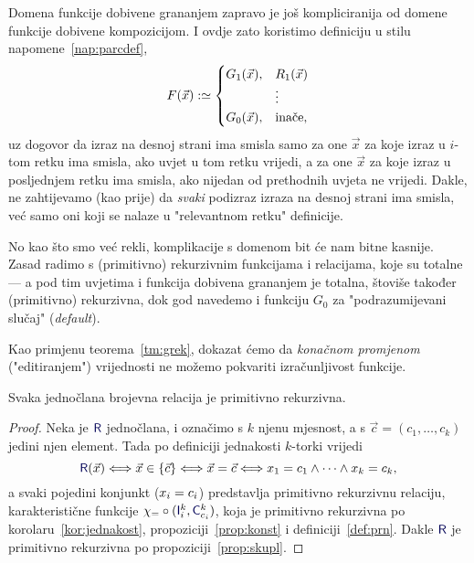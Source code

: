 Domena funkcije dobivene grananjem zapravo je još kompliciranija od domene funkcije dobivene kompozicijom. I ovdje zato koristimo definiciju u stilu napomene~\ref{nap:parcdef},
\begin{equation}
    F(\vec x):\simeq\begin{cases}
    G_1(\vec x),&R_1(\vec x)\\
    &\vdots\\
    G_0(\vec x),&\text{inače}\text,
    \end{cases}
\end{equation}
uz dogovor da izraz na desnoj strani ima smisla samo za one $\vec x$ za koje izraz u $i$-tom retku ima smisla, ako uvjet u tom retku vrijedi, a za one $\vec x$ za koje izraz u posljednjem retku ima smisla, ako nijedan od prethodnih uvjeta ne vrijedi. Dakle, ne zahtijevamo (kao prije) da \emph{svaki} podizraz izraza na desnoj strani ima smisla, već samo oni koji se nalaze u "relevantnom retku" definicije.

No kao što smo već rekli, komplikacije s domenom bit će nam bitne kasnije. Zasad radimo s (primitivno) rekurzivnim funkcijama i relacijama, koje su totalne --- a pod tim uvjetima i funkcija dobivena grananjem je totalna, štoviše također (primitivno) rekurzivna, dok god navedemo i funkciju $G_0$ za "podrazumijevani slučaj" (\emph{default}).


Kao primjenu teorema~\ref{tm:grek}, dokazat ćemo da \emph{konačnom promjenom} ("editiranjem") vrijednosti ne možemo pokvariti izračunljivost funkcije. %

\begin{lema}[{name=[primitivna rekurzivnost jednočlanih relacija]}]\label{lm:r1prn}
Svaka jednočlana brojevna relacija je primitivno rekurzivna.
\end{lema}
\begin{proof}
Neka je $\f R$ jednočlana, i označimo s $k$ njenu mjesnost, a s $\vec c=(c_1,\dotsc,c_k)$ jedini njen element. Tada po definiciji jednakosti $k$-torki vrijedi
\begin{equation}
    \f R(\vec x)\Longleftrightarrow\vec x\in\{\vec c\}\Longleftrightarrow\vec x=\vec c\Longleftrightarrow x_1\eq c_1\land\dotsb\land x_k\eq c_k\text,
\end{equation}
a svaki pojedini konjunkt ($x_i= c_i$) predstavlja primitivno rekurzivnu relaciju, karakteristične funkcije $\chi_\eq\circ(\f I_i^k,\f C_{c_i}^k)$, koja je primitivno rekurzivna po korolaru~\ref{kor:jednakost}, propoziciji~\ref{prop:konst} i definiciji~\ref{def:prn}. Dakle $\f R$ je primitivno rekurzivna po propoziciji~\ref{prop:skupl}.
\end{proof}

